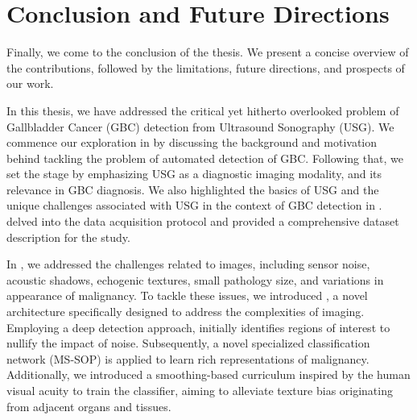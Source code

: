\chapter{Conclusion and Future Directions}
%
\label{chap:conclusion}
%
Finally, we come to the conclusion of the thesis. We present a concise overview of the contributions, followed by the limitations, future directions, and prospects of our work.

\par In this thesis, we have addressed the critical yet hitherto overlooked problem of Gallbladder Cancer (GBC) detection from Ultrasound Sonography (USG). We commence our exploration in  by discussing the background and motivation behind tackling the problem of automated detection of GBC. 
Following that, we set the stage by emphasizing USG as a diagnostic imaging modality, and its relevance in GBC diagnosis. We also highlighted the basics of USG and the unique challenges associated with USG in the context of GBC detection in .  delved into the data acquisition protocol and provided a comprehensive dataset description for the study.

\par In , we addressed the challenges related to \usg images, including sensor noise, acoustic shadows, echogenic textures, small pathology size, and variations in appearance of malignancy. To tackle these issues, we introduced \gbcnet \cite{basu2022surpassing}, a novel architecture specifically designed to address the complexities of \usg imaging. Employing a deep detection approach, \gbcnet initially identifies regions of interest to nullify the impact of noise. Subsequently, a novel specialized classification network (MS-SOP) is applied to learn rich representations of malignancy. Additionally, we introduced a smoothing-based curriculum inspired by the human visual acuity to train the classifier, aiming to alleviate texture bias originating from adjacent organs and tissues.


